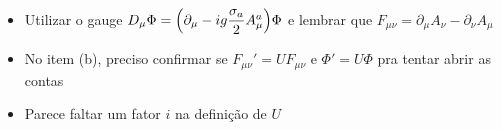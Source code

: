 \begin{itemize}
    \item Utilizar o gauge $D_{\mu}\Phi = \qty(\partial_{\mu} - ig\dfrac{\sigma_{a}}{2}A_{\mu}^{a})\Phi$ e lembrar que $F_{\mu\nu} = \partial_{\mu}A_{\nu} - \partial_{\nu}A_{\mu}$
    \item No item (b), preciso confirmar se $F_{\mu\nu}' = UF_{\mu\nu}$ e $\Phi' = U\Phi$ pra tentar abrir as contas
    \item Parece faltar um fator $i$ na definição de $U$
\end{itemize}

